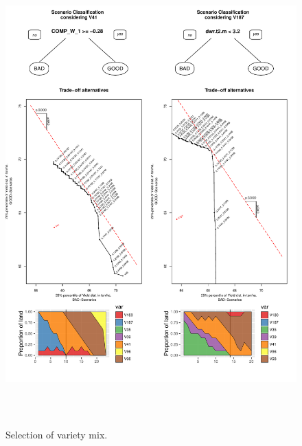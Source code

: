 \documentclass[syngen,nonblindrev]{informs3-syngen}
\begin{document}
\begin{figure}[t]
\begin{center}
\includegraphics[height=7in]{frontier}
\caption{Selection of variety mix.} \label{frontier}
\end{center}
\end{figure}
\end{document}
